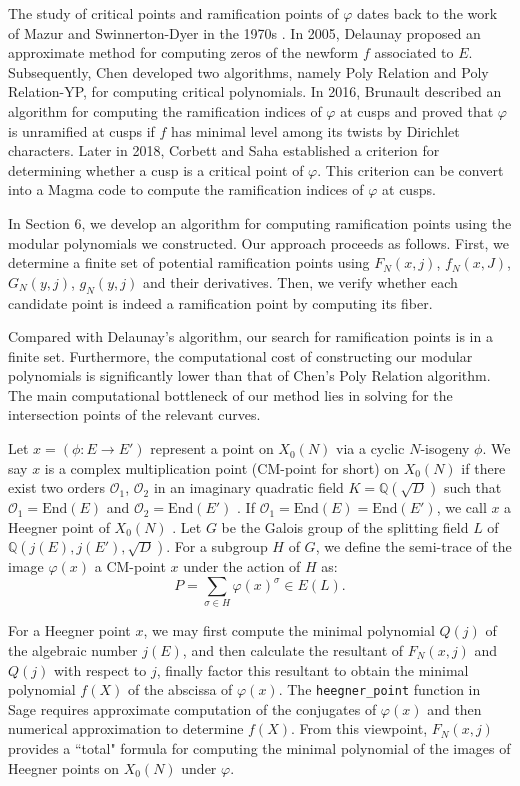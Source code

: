 \documentclass[10pt, a4paper]{article}
\begin{document}
The study of critical points and ramification points of $\varphi$ dates back to the work of Mazur and Swinnerton-Dyer in the 1970s \cite{Mazur-Swinnerton-Dyer}.  In 2005,  Delaunay \cite{Delaunay} proposed an approximate method for computing zeros of the newform $f$ associated to $E$. Subsequently, Chen \cite{Chen} developed two algorithms, namely Poly Relation and Poly Relation-YP, for computing critical polynomials.
In 2016, Brunault \cite{Brunault} described an algorithm for computing the ramification indices of $\varphi$ at cusps and proved that $\varphi$ is unramified at cusps if $f$ has minimal level among its twists by Dirichlet characters. Later in 2018, Corbett and Saha \cite{Corbett-Saha} established a criterion for determining whether a cusp is a critical point of $\varphi$.  This criterion can be  convert  into  a Magma code  to compute the ramification indices of $\varphi$ at cusps.

In Section 6, we develop an algorithm for computing ramification points using the modular polynomials we constructed. Our approach proceeds as follows.
First, we determine a finite set of potential ramification points using $F_N(x,j)$, $f_N(x,J)$, $G_N(y,j)$, $g_N(y,j)$ and their derivatives. Then, we verify whether each candidate point is indeed a ramification point by computing its fiber.

Compared with Delaunay's algorithm, our search for ramification points is in  a finite set. Furthermore, the computational cost of constructing our modular polynomials is significantly lower than that of Chen's Poly Relation algorithm. The main computational bottleneck of our method lies in solving for the intersection points of the relevant curves.

Let $x = (\phi: E \rightarrow E')$ represent a point on $X_0(N)$ via a cyclic $N$-isogeny $\phi$. We say $x$ is a  complex multiplication point (CM-point for short) on $X_0(N)$ if there exist two orders $\mathcal{O}_1$, $\mathcal{O}_2$ in an imaginary quadratic field $K = \mathbb{Q}(\sqrt{D})$ such that $\mathcal{O}_1 = \text{End}(E)$ and $\mathcal{O}_2 = \text{End}(E')$ \cite{Zhang}. If $\mathcal{O}_1 = \text{End}(E) = \text{End}(E')$, we call $x$ a Heegner point of $X_0(N)$ \cite{Gross}.   Let $G$ be  the Galois group of the splitting field $L$  of  $\mathbb{Q}(j(E), j(E'), \sqrt{D})$.  For a subgroup $H$ of $G$, we define the semi-trace of the image $\varphi(x)$ a CM-point $x$ under the action of $H$ as:
\[
P = \sum_{\sigma \in H} \varphi(x)^\sigma \in E(L).
\]

For a Heegner point $x$, we may first compute the minimal polynomial $Q(j)$ of the algebraic number $j(E)$, and then calculate the resultant of $F_N(x,j)$ and $Q(j)$ with respect to $j$,
finally factor this resultant to obtain the minimal polynomial $f(X)$ of  the abscissa of $\varphi(x)$.
The \texttt{heegner\_point} function in Sage  \cite{Sage} requires
approximate computation of the conjugates of  $\varphi(x)$  and then
numerical approximation to determine $f(X)$.
From this viewpoint, $F_N(x,j)$  provides   a ``total"  formula  for computing the minimal polynomial of
the images of  Heegner points on $X_0(N)$ under $\varphi$.
\end{document}
